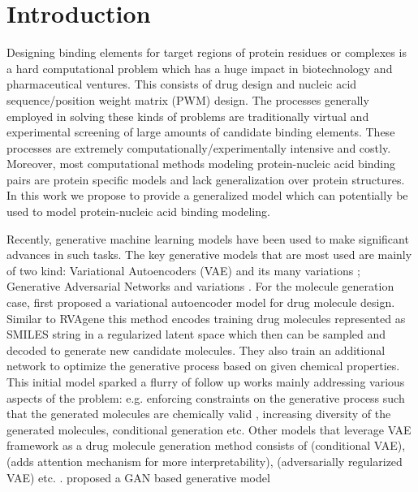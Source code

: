 \section{Introduction} 

Designing binding elements for target regions of protein residues or complexes is a hard
computational problem  which has a huge impact in biotechnology and pharmaceutical ventures.
This consists of drug design and nucleic acid sequence/position weight matrix (PWM)
design. The processes generally employed in solving these kinds of problems are traditionally virtual and
experimental screening of large amounts of candidate binding elements. These processes are extremely
computationally/experimentally intensive and costly. Moreover, 
most computational methods modeling protein-nucleic acid binding pairs are protein specific models
and lack generalization over protein structures. In this work we propose to provide a generalized
model which can potentially be used to model protein-nucleic acid binding modeling.
\par
Recently, generative machine learning models have
been used to make significant advances in such tasks. The key generative models that are most
used are mainly of two kind: Variational Autoencoders (VAE) \citep{Kingma2014} and its many
variations \citep{higgins2016beta, sohn2015learning,dilokthanakul2016deep}; Generative Adversarial
Networks \citep{goodfellow2014generative} and variations \citep{wang2018high,zhu2017unpaired}.
For the molecule generation case, \citet{gomez2018automatic} first proposed a variational autoencoder model for drug molecule design.
Similar to RVAgene \citep{mitra2020rvagene} this method encodes training drug molecules represented as SMILES
\citep{weininger1988smiles} string in a regularized latent space which then can be sampled and
decoded to generate new candidate molecules. They also train an additional network to optimize the
generative process based on given chemical properties. This initial model sparked a flurry of follow up 
works mainly addressing various aspects of the problem: e.g. enforcing constraints on the generative process 
such that the generated molecules are chemically valid \citet{kusner2017grammar}, increasing diversity of the generated
molecules, conditional generation etc.  Other models that leverage VAE framework as a drug molecule
generation method consists of \citet{lim2018molecular} (conditional VAE), \citet{dollar2021giving}
(adds attention mechanism for more interpretability), \citet{hong2019molecular} (adversarially
regularized VAE) etc. . \citet{kadurin2017drugan} proposed a GAN based generative model
